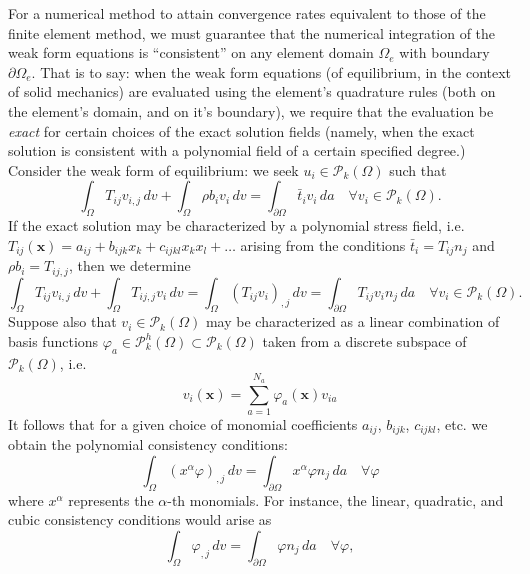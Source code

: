 \documentclass[11pt]{article} %
\begin{document}
For a numerical method to attain convergence rates equivalent to those of the finite element method, we must guarantee that the numerical integration of the weak form equations is ``consistent'' on any element domain $\Omega_e$ with boundary $\partial \Omega_e$. That is to say: when the weak form equations (of equilibrium, in the context of solid mechanics) are evaluated using the element's quadrature rules (both on the element's domain, and on it's boundary), we require that the evaluation be \textit{exact} for certain choices of the exact solution fields (namely, when the exact solution is consistent with a polynomial field of a certain specified degree.) Consider the weak form of equilibrium: we seek $u_i \in \mathcal{P}_k(\Omega)$ such that
\begin{equation}
	\int_{\Omega} T_{ij} v_{i,j} \, dv + \int_{\Omega} \rho b_i v_i \, dv = \int_{\partial \Omega} \bar{t}_i v_i \, da \quad \forall v_i \in \mathcal{P}_k(\Omega).
\end{equation}
If the exact solution may be characterized by a polynomial stress field, i.e. $T_{ij} (\mathbf{x}) = a_{ij} + b_{ijk} x_k + c_{ijkl} x_k x_l + \ldots$ arising from the conditions $\bar{t}_i = T_{ij} n_j$ and $\rho b_i = T_{ij,j}$, then we determine
\begin{equation}
	\int_{\Omega} T_{ij} v_{i,j} \, dv + \int_{\Omega} T_{ij,j} v_i \, dv = \int_{\Omega} (T_{ij} v_i)_{,j} \, dv = \int_{\partial \Omega} T_{ij} v_i n_j \, da \quad \forall v_i \in \mathcal{P}_k(\Omega).
\end{equation}
Suppose also that $v_i \in \mathcal{P}_k(\Omega)$ may be characterized as a linear combination of basis functions $\varphi_a \in \mathcal{P}^h_k(\Omega) \subset \mathcal{P}_k(\Omega)$ taken from a discrete subspace of $\mathcal{P}_k(\Omega)$, i.e.
\begin{equation}
	v_i (\mathbf{x}) = \sum_{a=1}^{N_a} \varphi_a (\mathbf{x}) v_{ia}
\end{equation}
It follows that for a given choice of monomial coefficients $a_{ij}$, $b_{ijk}$, $c_{ijkl}$, etc. we obtain the polynomial consistency conditions:
\begin{equation}
	\int_{\Omega} (x^\alpha \varphi)_{,j} \, dv = \int_{\partial \Omega} x^\alpha \varphi n_j \, da \quad \forall \varphi
\end{equation}
where $x^\alpha$ represents the $\alpha$-th monomials. For instance, the linear, quadratic, and cubic consistency conditions would arise as
\begin{equation}
	\int_{\Omega} \varphi_{,j} \, dv = \int_{\partial \Omega} \varphi n_j \, da \quad \forall \varphi,
\end{equation}
\end{document}
